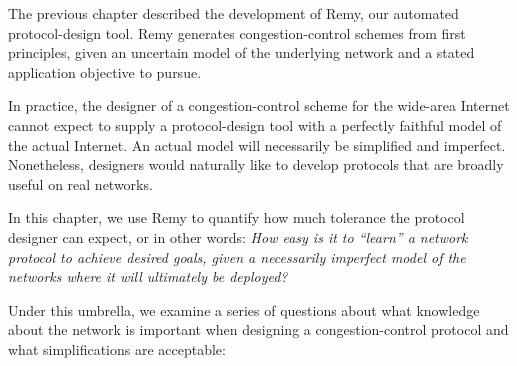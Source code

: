 \label{s:intro}

The previous chapter described the development of Remy, our automated
protocol-design tool. Remy generates congestion-control schemes from
first principles, given an uncertain model of the underlying network
and a stated application objective to pursue.

In practice, the designer of a congestion-control scheme for the
wide-area Internet cannot expect to supply a protocol-design tool with
a perfectly faithful model of the actual Internet. An actual model
will necessarily be simplified and imperfect. Nonetheless, designers
would naturally like to develop protocols that are broadly useful on
real networks.

In this chapter, we use Remy to quantify how much tolerance the
protocol designer can expect, or in other words: \emph{How easy is it
  to ``learn'' a network protocol to achieve desired goals, given a
  necessarily imperfect model of the networks where it will ultimately
  be deployed?}

Under this umbrella, we examine a series of questions about what
knowledge about the network is important when designing a
congestion-control protocol and what simplifications are acceptable:

